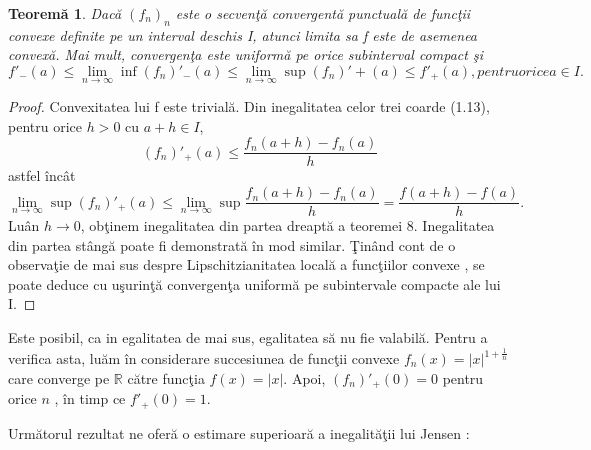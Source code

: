 \documentclass[a4paper,12pt,oneside]{report}
\newtheorem{theorem}{Teorem\u a}
\begin{document}
\begin{theorem}
Dac\u{a} \(\left ( f_{n} \right )_{n}\) este o secven\c{t}\u{a} convergent\u{a} punctual\u{a} de func\c{t}ii convexe definite pe un interval deschis I, atunci limita sa f este de asemenea convex\u{a}. Mai mult, convergen\c{t}a este uniform\u{a} pe orice subinterval compact \c{s}i 
\begin{displaymath}
   {f}'_{-}\left ( a \right ) \leq \lim_{n\rightarrow \infty } \inf {\left (f_{n}  \right )}'_{-}\left ( a \right )\leq \lim_{n\rightarrow \infty }\sup {\left (f_{n}  \right )}' + \left ( a \right ) \leq {f}'_{+}\left ( a \right ), pentru orice a \in I. 
\end{displaymath}
\end{theorem}
\begin{proof}
Convexitatea lui f este trivial\u{a}. Din inegalitatea celor trei coarde (1.13), pentru orice \(h >  0\) cu \(a + h \in I\),
\begin{displaymath}
   {\left (f_{n}  \right )}'_{+}\left ( a \right ) \leq  \frac{f_{n}\left ( a + h \right ) - f_{n}\left ( a \right )}{h}
\end{displaymath}
astfel \^{i}nc\^{a}t  
\begin{displaymath}
   \lim_{n\rightarrow \infty } \sup {\left ( f_{n} \right )}'_{+}\left ( a \right ) \leq \lim_{n\rightarrow \infty } \sup \frac{f_{n}\left ( a + h \right ) - f_{n}\left ( a \right )}{h} = \frac{f\left ( a + h \right ) - f\left ( a \right )}{h}. 
\end{displaymath}
Lu\^{a}n \(h\rightarrow 0\), ob\c{t}inem inegalitatea din partea dreapt\u{a} a teoremei 8. Inegalitatea din partea st\^{a}ng\u{a} poate fi demonstrat\u{a} \^{i}n mod similar. \c{T}in\^{a}nd cont de o observa\c{t}ie de mai sus despre Lipschitzianitatea local\u{a} a  func\c{t}iilor convexe , se poate deduce cu u\c{s}urin\c{t}\u{a} convergen\c{t}a uniform\u{a} pe subintervale compacte ale lui I. 
\end{proof}
Este posibil, ca in egalitatea de mai sus, egalitatea s\u{a} nu fie valabil\u{a}. Pentru a verifica asta, lu\u{a}m \^{i}n considerare succesiunea de func\c{t}ii convexe \(f_{n}\left ( x \right ) = \left | x \right |^{1 + \frac{1}{n}}\) care converge pe \(\mathbb{R}\) c\u{a}tre func\c{t}ia \(f\left ( x  \right ) = \left | x \right |.\) Apoi, \({\left ( f_{n} \right )}'_{+}\left ( 0 \right ) = 0\) pentru orice \(n\) , \^{i}n timp ce \({f}'_{+}\left ( 0 \right ) = 1.\) 

Urm\u{a}torul rezultat ne ofer\u{a} o estimare superioar\u{a} a inegalit\u{a}\c{t}ii lui Jensen :
\end{document}
